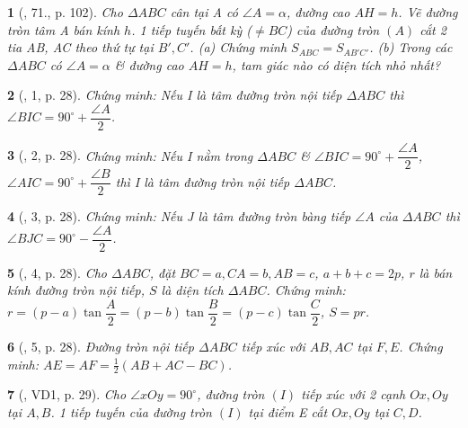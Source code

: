 \documentclass{article}
\newtheorem{baitoan}{}
\begin{document}
\begin{baitoan}[\cite{Binh_Toan_9_tap_1}, 71., p. 102]
	Cho $\Delta ABC$ cân tại A có $\angle{A} = \alpha$, đường cao $AH = h$. Vẽ đường tròn tâm A bán kính $h$. 1 tiếp tuyến bất kỳ ($\ne BC$) của đường tròn $(A)$ cắt 2 tia AB, AC theo thứ tự tại $B',C'$. (a) Chứng minh $S_{ABC} = S_{AB'C'}$. (b) Trong các $\Delta ABC$ có $\angle{A} = \alpha$ \& đường cao $AH = h$, tam giác nào có diện tích nhỏ nhất?
\end{baitoan}

\begin{baitoan}[\cite{TLCT_THCS_Toan_9_hinh_hoc}, 1, p. 28]
	Chứng minh: Nếu I là tâm đường tròn nội tiếp $\Delta ABC$ thì $\angle{BIC} = 90^\circ + \dfrac{\angle{A}}{2}$.
\end{baitoan}

\begin{baitoan}[\cite{TLCT_THCS_Toan_9_hinh_hoc}, 2, p. 28]
	Chứng minh: Nếu I nằm trong $\Delta ABC$ \& $\angle{BIC} = 90^\circ + \dfrac{\angle{A}}{2}$, $\angle{AIC} = 90^\circ + \dfrac{\angle{B}}{2}$ thì I là tâm đường tròn nội tiếp $\Delta ABC$.
\end{baitoan}

\begin{baitoan}[\cite{TLCT_THCS_Toan_9_hinh_hoc}, 3, p. 28]
	Chứng minh: Nếu J là tâm đường tròn bàng tiếp $\angle{A}$ của $\Delta ABC$ thì $\angle{BJC} = 90^\circ - \dfrac{\angle{A}}{2}$.
\end{baitoan}

\begin{baitoan}[\cite{TLCT_THCS_Toan_9_hinh_hoc}, 4, p. 28]
	Cho $\Delta ABC$, đặt $BC = a,CA = b,AB = c$, $a + b + c = 2p$, $r$ là bán kính đường tròn nội tiếp, $S$ là diện tích $\Delta ABC$. Chứng minh: $r = (p - a)\tan\dfrac{A}{2} = (p - b)\tan\dfrac{B}{2} = (p - c)\tan\dfrac{C}{2}$, $S = pr$.
\end{baitoan}

\begin{baitoan}[\cite{TLCT_THCS_Toan_9_hinh_hoc}, 5, p. 28]
	Đường tròn nội tiếp $\Delta ABC$ tiếp xúc với $AB,AC$ tại $F,E$. Chứng minh: $AE = AF = \frac{1}{2}(AB + AC - BC)$.
\end{baitoan}

\begin{baitoan}[\cite{TLCT_THCS_Toan_9_hinh_hoc}, VD1, p. 29]
	Cho $\angle{xOy} = 90^\circ$, đường tròn $(I)$ tiếp xúc với 2 cạnh $Ox,Oy$ tại $A,B$. 1 tiếp tuyến của đường tròn $(I)$ tại điểm E cắt $Ox,Oy$ tại $C,D$.
\end{baitoan}
\end{document}
